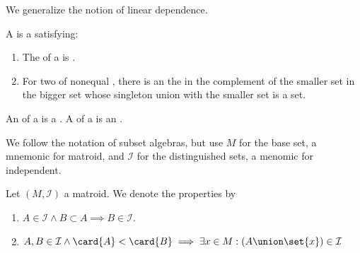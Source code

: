 
\sbasic


















\sstart
{}


We generalize the notion of linear dependence.


A  is a
satisfying:
\begin{enumerate}

  \item The  of a
     is
    .

  \item For two 
     of nonequal ,
    there is an  the 
    in the complement of the smaller set in the bigger set whose
    singleton union with the smaller set is a  set.
\end{enumerate}

An 
of a  is a
.
A 
of a  is an
.



We follow the notation of subset algebras, but use $M$ for the base
set, a mnemonic for matroid, and $\mathcal{I}$ for the distinguished
sets, a menomic for independent.

Let $(M, \mathcal{I})$ a matroid.
We denote the properties by
\begin{enumerate}
  \item $A \in \mathcal{I} \land B \subset A \implies B \in \mathcal{I}$.
  \item $A, B \in \mathcal{I} \land \card{A} < \card{B} \implies \exists x \in M: (A \union \set{x}) \in \mathcal{I}$
\end{enumerate}
\strats
